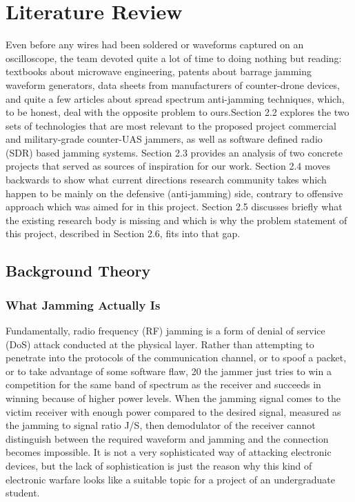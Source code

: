 \documentclass[12pt,a4paper]{report}
\begin{document}
	\chapter{Literature Review}
	Even before any wires had been soldered or waveforms captured on an oscilloscope, the team devoted quite a lot of time to doing nothing but reading: textbooks about microwave engineering, patents about barrage jamming waveform generators, data sheets from manufacturers of counter-drone devices, and quite a few articles about spread spectrum anti-jamming techniques, which, to be honest, deal with the opposite problem to ours.Section 2.2 explores the two sets of technologies that are most relevant to the proposed project  commercial and military-grade counter-UAS jammers, as well as software defined radio (SDR) based jamming systems. Section 2.3 provides an analysis of two concrete projects that served as sources of inspiration for our work. Section 2.4 moves backwards to show what current directions research community takes which happen to be mainly on the defensive (anti-jamming) side, contrary to offensive approach which was aimed for in this project. Section 2.5 discusses briefly what the existing research body is missing  and which is why the problem statement of this project, described in Section 2.6, fits into that gap.
	
	\section{Background Theory}
	\subsection{What Jamming Actually Is}
	Fundamentally, radio frequency (RF) jamming is a form of denial of service (DoS) attack conducted at the physical layer.
	Rather than attempting to penetrate into the protocols of the communication channel, or to spoof a packet, or to take advantage of some software flaw, 20
	the jammer just tries to win a competition for the same band of spectrum as the receiver and succeeds in winning because of higher power levels. When the jamming signal comes to the victim receiver with enough power compared to the desired signal, measured as the jamming to signal ratio J/S, then demodulator of the receiver cannot distinguish between the required waveform and jamming and the connection becomes impossible. It is not a very sophisticated way of attacking electronic devices, but the lack of sophistication is just the reason why this kind of electronic warfare looks like a suitable topic for a project of an undergraduate student.
	
\end{document}
